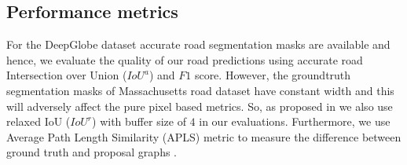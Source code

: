 \documentclass[letterpaper, 10 pt, conference]{ieeeconf}
\begin{document}
\vspace{-10pt}
\subsection{Performance metrics} For the DeepGlobe dataset accurate road segmentation masks are available and hence, we evaluate the quality of our road predictions using accurate road Intersection over Union ($IoU^a$) and $F1$ score. However, the groundtruth segmentation masks of Massachusetts road dataset have constant width and this will adversely affect the pure pixel based metrics. So, as proposed in \cite{mnih2012learning} we also use relaxed IoU ($IoU^r$) with buffer size of $4$ in our evaluations. Furthermore, we use Average Path Length Similarity (APLS) metric to measure the difference between ground truth and proposal graphs \cite{van2017spacenet}. 
\end{document}
